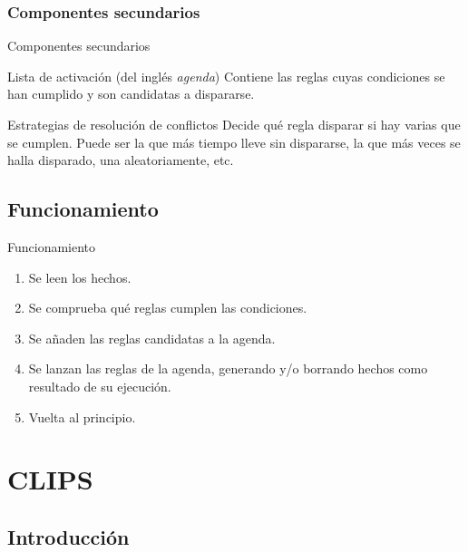 \documentclass[smaller,spanish,xcolor=svgnames]{beamer}
\begin{document}
\subsubsection{Componentes secundarios}

\begin{frame}{Componentes secundarios}
    \begin{block}{Lista de activación (del inglés \textit{agenda})}
      Contiene las reglas cuyas condiciones se han cumplido y son candidatas a
      dispararse.
    \end{block}

    \begin{block}{Estrategias de resolución de conflictos}
      Decide qué regla disparar si hay varias que se cumplen. Puede ser la que más tiempo lleve sin dispararse, la que más veces se halla disparado, una aleatoriamente, etc.
    \end{block}  
\end{frame}

\subsection{Funcionamiento}
\begin{frame}{Funcionamiento}
  \begin{enumerate}
  \item Se leen los hechos.
  \item Se comprueba qué reglas cumplen las condiciones.
  \item Se añaden las reglas candidatas a la agenda.
  \item Se lanzan las reglas de la agenda, generando y/o borrando hechos como resultado de su ejecución.
  \item Vuelta al principio.
  \end{enumerate}

\end{frame}

\section{CLIPS}

\subsection{Introducción}
\end{document}
